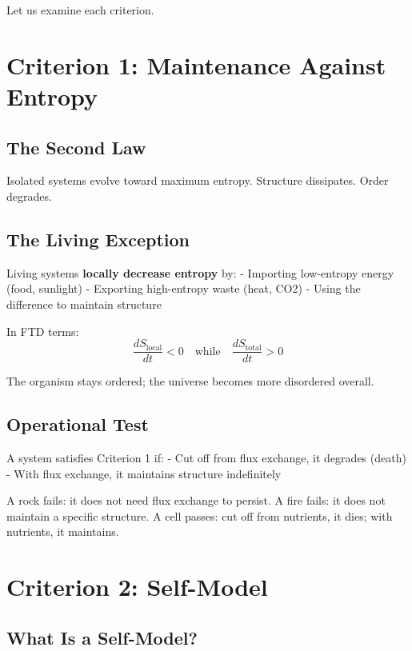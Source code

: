 \documentclass[
  11pt,
  letterpaper,
  twoside,
  openright]{book}
\begin{document}
Let us examine each criterion.

\section{Criterion 1: Maintenance Against
Entropy}\label{criterion-1-maintenance-against-entropy}

\subsection{The Second Law}\label{the-second-law}

Isolated systems evolve toward maximum entropy. Structure dissipates.
Order degrades.

\subsection{The Living Exception}\label{the-living-exception}

Living systems \textbf{locally decrease entropy} by: - Importing
low-entropy energy (food, sunlight) - Exporting high-entropy waste
(heat, CO2) - Using the difference to maintain structure

In FTD terms:
\[\frac{d S_{\text{local}}}{dt} < 0 \quad \text{while} \quad \frac{d S_{\text{total}}}{dt} > 0\]

The organism stays ordered; the universe becomes more disordered
overall.

\subsection{Operational Test}\label{operational-test}

A system satisfies Criterion 1 if: - Cut off from flux exchange, it
degrades (death) - With flux exchange, it maintains structure
indefinitely

A rock fails: it does not need flux exchange to persist. A fire fails:
it does not maintain a specific structure. A cell passes: cut off from
nutrients, it dies; with nutrients, it maintains.

\section{Criterion 2: Self-Model}\label{criterion-2-self-model}

\subsection{What Is a Self-Model?}\label{what-is-a-self-model}
\end{document}
